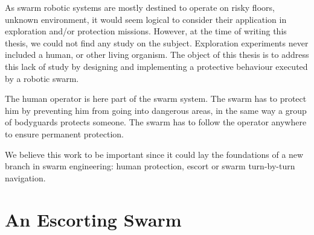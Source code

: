 \documentclass[oneside, a4paper, 12pt]{memoir}
\begin{document}

	
		
		
	
	As swarm robotic systems are mostly destined to operate on risky floors, unknown environment, it would seem logical to consider their application in exploration and/or protection missions. However, at the time of writing this thesis, we could not find any study on the subject. Exploration experiments never included a human, or other living organism. The object of this thesis is to address this lack of study by designing and implementing a protective behaviour executed by a robotic swarm.
	
	The human operator is here part of the swarm system. The swarm has to protect him by preventing him from going into dangerous areas, in the same way a group of bodyguards protects someone. The swarm has to follow the operator anywhere to ensure permanent protection.
	
	We believe this work to be important since it could lay the foundations of a new branch in swarm engineering: human protection, escort or swarm turn-by-turn navigation.

\chapter{An Escorting Swarm}
\label{chap:escorting_swarm}

\end{document}
